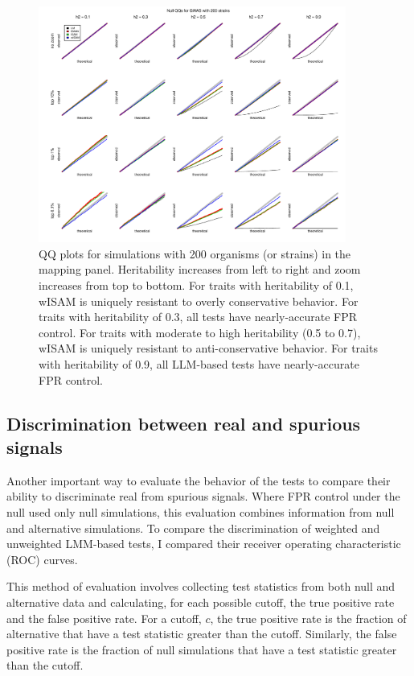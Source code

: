 \begin{figure}
  \centering
  \includegraphics[width = 0.9\textwidth]{images/2018-05-19alt_heterosked_sims_nstrain=200_nsnps=100_nsims=10000.pdf}
  \caption[
    QQ plots for simulations with 200 organisms in the mapping panel.
  ]{
    QQ plots for simulations with 200 organisms (or strains) in the mapping panel.
    Heritability increases from left to right and zoom increases from top to bottom.
    For traits with heritability of 0.1, wISAM is uniquely resistant to overly conservative behavior.
    For traits with heritability of 0.3, all tests have nearly-accurate FPR control.
    For traits with moderate to high heritability (0.5 to 0.7), wISAM is uniquely resistant to anti-conservative behavior.
    For traits with heritability of 0.9, all LLM-based tests have nearly-accurate FPR control.
  }
  \label{fig:qqmegaplot3}
\end{figure}


\subsection{Discrimination between real and spurious signals}

Another important way to evaluate the behavior of the tests to compare their ability to discriminate real from spurious signals.
Where FPR control under the null used only null simulations, this evaluation combines information from null and alternative simulations.
To compare the discrimination of weighted and unweighted LMM-based tests, I compared their receiver operating characteristic (ROC) curves.

This method of evaluation involves collecting test statistics from both null and alternative data and calculating, for each possible cutoff, the true positive rate and the false positive rate.
For a cutoff, $c$, the true positive rate is the fraction of alternative that have a test statistic greater than the cutoff.
Similarly, the false positive rate is the fraction of null simulations that have a test statistic greater than the cutoff.

